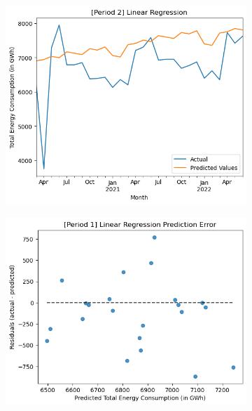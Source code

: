 \documentclass[runningheads]{llncs}
\begin{document}
\begin{center}
\begin{figure}[h]
\begin{subfigure}[h]{0.6\textwidth}
         \includegraphics[width=\textwidth]{results/lr/p2.png}
         \caption{}
         \label{fig:resultLR-p2}
    \end{subfigure}
    \begin{subfigure}[h]{0.60\textwidth}
         \centering
         \hspace*{-1.3in}
         \includegraphics[width=\textwidth]{results/lr/erp1.png}
         \caption{}
         \label{fig:errorLR-p1}
    \end{subfigure}
    \begin{subfigure}[h]{0.60\textwidth}
         \centering
         \hspace*{-1.3in}

\end{subfigure}
\end{figure}
\end{center}
\end{document}
